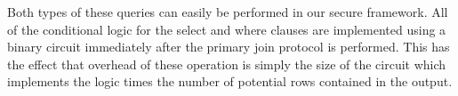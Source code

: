Both types of these queries can easily be performed in our secure framework. All of the conditional logic for the select and where clauses are implemented using a binary circuit immediately after the primary join protocol is performed. This has the effect that overhead of these operation is simply the size of the circuit which implements the logic times the number of potential rows contained in the output. 